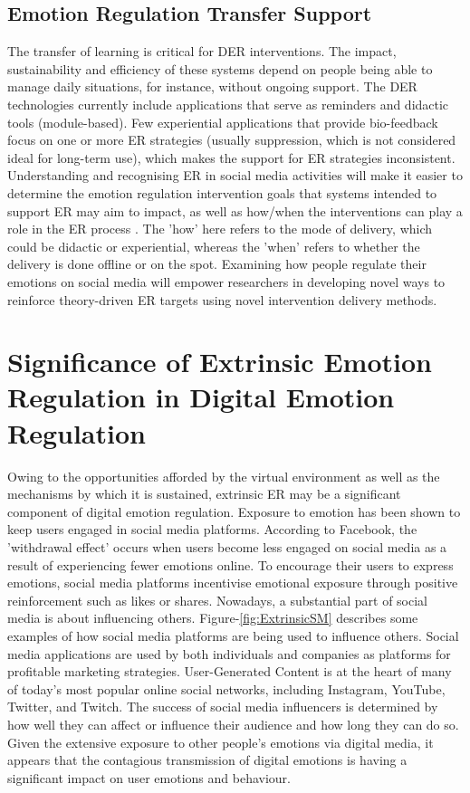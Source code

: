 \documentclass[lettersize,journal]{IEEEtran}
\begin{document}
\subsection{Emotion Regulation Transfer Support}
The transfer of learning is critical for DER interventions. The impact, sustainability and efficiency of these systems depend on people being able to manage daily situations, for instance, without ongoing support. The DER technologies currently include applications that serve as reminders and didactic tools (module-based). Few experiential applications that provide bio-feedback focus on one or more ER strategies (usually suppression, which is not considered ideal for long-term use), which makes the support for ER strategies inconsistent. Understanding and recognising ER in social media activities will make it easier to determine the emotion regulation intervention goals that systems intended to support ER may aim to impact, as well as how/when the interventions can play a role in the ER process \cite{slovak2022designing}. The 'how' here refers to the mode of delivery, which could be didactic or experiential, whereas the 'when' refers to whether the delivery is done offline or on the spot. Examining how people regulate their emotions on social media will empower researchers in developing novel ways to reinforce theory-driven ER targets using novel intervention delivery methods.




\section{Significance of Extrinsic Emotion Regulation in Digital Emotion Regulation}
Owing to the opportunities afforded by the virtual environment as well as the mechanisms by which it is sustained, extrinsic ER may be a significant component of digital emotion regulation. Exposure to emotion has been shown to keep users engaged in social media platforms. According to Facebook, the 'withdrawal effect' occurs when users become less engaged on social media as a result of experiencing fewer emotions online. To encourage their users to express emotions, social media platforms incentivise emotional exposure through positive reinforcement such as likes or shares. Nowadays, a substantial part of social media is about influencing others. Figure-\ref{fig:ExtrinsicSM} describes some examples of how social media platforms are being used to influence others. Social media applications are used by both individuals and companies as platforms for profitable marketing strategies. User-Generated Content is at the heart of many of today's most popular online social networks, including Instagram, YouTube, Twitter, and Twitch. The success of social media influencers is determined by how well they can affect or influence their audience and how long they can do so. Given the extensive exposure to other people's emotions via digital media, it appears that the contagious transmission of digital emotions is having a significant impact on user emotions and behaviour.
\end{document}

